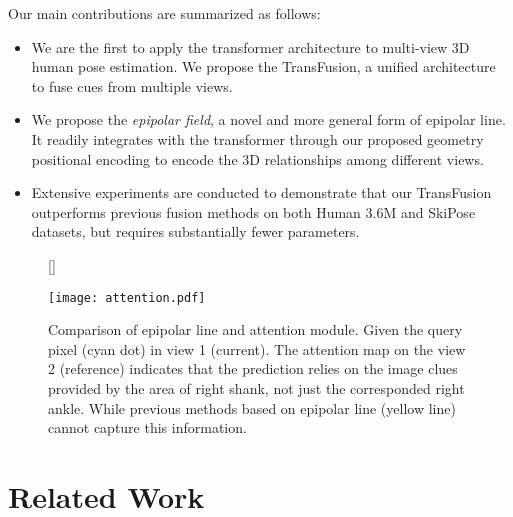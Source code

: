 \documentclass{bmvc2k}
\begin{document}
Our main contributions are summarized as follows:
\vspace{-0.5em}
\begin{itemize}
    \item We are the first to apply the transformer architecture to multi-view 3D human pose estimation. We propose the TransFusion, a unified architecture to fuse cues from multiple views. 
    
    \vspace{-0.5em}
    \item We propose the \textit{epipolar field}, a novel and more general form of epipolar line. It readily integrates with the transformer through our proposed geometry positional encoding to encode the 3D relationships among different views.  
    
    \vspace{-0.5em}
    \item Extensive experiments are conducted to demonstrate that our TransFusion  outperforms previous fusion methods on both Human 3.6M and SkiPose datasets, but requires substantially fewer parameters.
    \vspace{-0.5em}
\end{itemize}





\begin{figure}[!t]
[\FBwidth]
{\caption{ \footnotesize{Comparison of epipolar line and attention module. Given the query pixel (cyan dot) in view 1 (current). The attention map on the view 2 (reference) indicates that the prediction relies on the image clues provided by the area of right shank, not just the corresponded right ankle. While previous methods based on epipolar line (yellow line) cannot capture this information.   }}\label{fig:test}}
{\texttt{[image: attention.pdf]}}
\label{fig:att_map}
\end{figure}



\section{Related Work}
\vspace{-0.7em}
\end{document}
